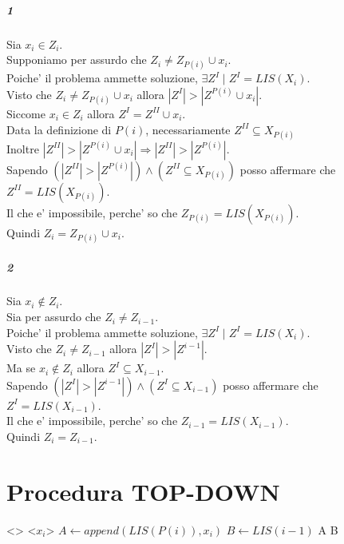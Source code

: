 \subparagraph{1}

Sia $x_i \in Z_i$. \\
Supponiamo per assurdo che $Z_i \ne Z_{P(i)} \cup x_i$. \\
Poiche' il problema ammette soluzione, $\exists Z^I \mid Z^I = LIS(X_i)$. \\
Visto che $Z_i \ne Z_{P(i)} \cup x_i$ allora $|Z^I| > |Z^{P(i)} \cup x_i|$.\\
Siccome $x_i \in Z_i$ allora $Z^I = Z^{II} \cup x_i$. \\
Data la definizione di $P(i)$, necessariamente $Z^{II} \subseteq X_{P(i)}$ \\
Inoltre $|Z^{II}| > |Z^{P(i)} \cup x_i| \Rightarrow |Z^{II}| > |Z^{P(i)}|$. \\
Sapendo $(|Z^{II}| > |Z^{P(i)}|) \land (Z^{II} \subseteq X_{P(i)})$ posso affermare che $Z^{II} = LIS(X_{P(i)})$. \\
Il che e' impossibile, perche' so che $Z_{P(i)} = LIS(X_{P(i)})$. \\
Quindi $Z_i = Z_{P(i)} \cup x_i$.

\subparagraph{2}

Sia $x_i \notin Z_i$. \\
Sia per assurdo che $Z_i \ne Z_{i-1}$. \\
Poiche' il problema ammette soluzione, $\exists Z^I \mid Z^I = LIS(X_i)$. \\
Visto che $Z_i \ne Z_{i-1}$ allora $|Z^I| > |Z^{i-1}|$. \\
Ma se $x_i \notin Z_i$ allora $Z^{I} \subseteq X_{i-1}$. \\
Sapendo $(|Z^I| > |Z^{i-1}|) \land (Z^{I} \subseteq X_{i-1})$ posso affermare che $Z^{I} = LIS(X_{i-1})$. \\
Il che e' impossibile, perche' so che $Z_{i-1} = LIS(X_{i-1})$. \\
Quindi $Z_i = Z_{i-1}$.

\newpage

\section{Procedura TOP-DOWN}

\begin{algorithm}
    \begin{algorithmic}
                \State \Return <>
                \State \Return <$x_i$>
            \Else
                \State $A \gets append(LIS(P(i)), x_i)$
                \State $B \gets LIS(i-1)$
                    \State \Return A
                \Else
                    \State \Return B
                \EndIf
            \EndIf
        \EndProcedure
    \end{algorithmic}
\end{algorithm}

